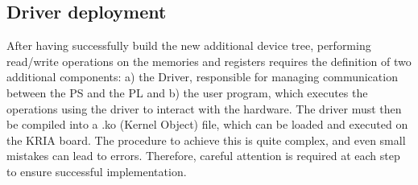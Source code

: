 \subsection{Driver deployment}
After having successfully build the new additional device tree, performing read/write operations on the memories and registers requires the definition of two additional components: a) the Driver, responsible for managing communication between the PS and the PL and b) the user program, which executes the operations using the driver to interact with the hardware. The driver must then be compiled into a .ko (Kernel Object) file, which can be loaded and executed on the KRIA board. The procedure to achieve this is quite complex, and even small mistakes can lead to errors. Therefore, careful attention is required at each step to ensure successful implementation.

